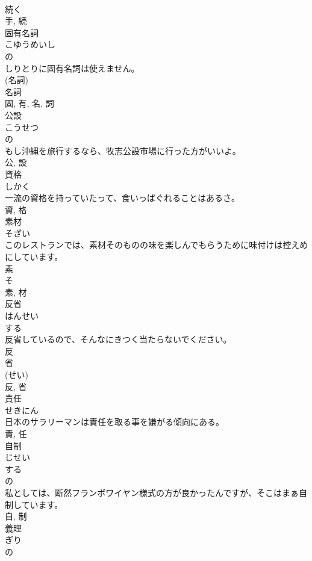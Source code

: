 \documentclass[8pt]{extreport}
\begin{document}
\begin{CJK}{UTF8}{min}
\\	続く 
\\	手, 続	
\\	固有名詞	
\\	こゆうめいし	
\\	の 
\\	しりとりに固有名詞は使えません。	
\\	(名詞) 
\\	名詞 
\\	固, 有, 名, 詞	
\\	公設	
\\	こうせつ	
\\	の 
\\	もし沖縄を旅行するなら、牧志公設市場に行った方がいいよ。	
\\	公, 設	
\\	資格	
\\	しかく	
\\	一流の資格を持っていたって、食いっぱぐれることはあるさ。	
\\	資, 格	
\\	素材	
\\	そざい	
\\	このレストランでは、素材そのものの味を楽しんでもらうために味付けは控えめにしています。	
\\	素 
\\	そ 
\\	素, 材	
\\	反省	
\\	はんせい	
\\	する 
\\	反省しているので、そんなにきつく当たらないでください。	
\\	反 
\\	省 
\\	(せい) 
\\	反, 省	
\\	責任	
\\	せきにん	
\\	日本のサラリーマンは責任を取る事を嫌がる傾向にある。	
\\	責, 任	
\\	自制	
\\	じせい	
\\	する 
\\	の 
\\	私としては、断然フランボワイヤン様式の方が良かったんですが、そこはまぁ自制しています。	
\\	自, 制	
\\	義理	
\\	ぎり	
\\	の 

\end{CJK}
\end{document}
